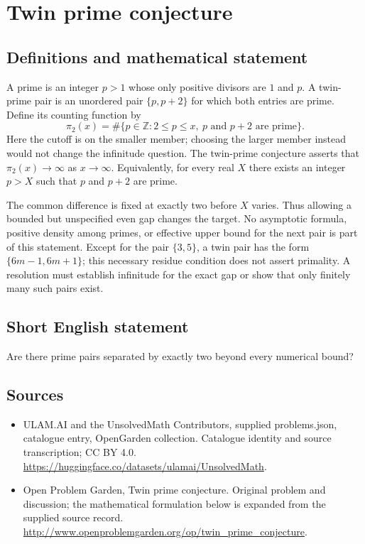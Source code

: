 \documentclass[11pt,a4paper]{article}
\begin{document}
\section*{Twin prime conjecture}\label{statement}

\subsection{Definitions and mathematical statement}
A prime is an integer $p>1$ whose only positive divisors are $1$ and $p$.
A twin-prime pair is an unordered pair $\{p,p+2\}$ for which both
entries are prime. Define its counting function by
\[
 \pi_2(x)=\#\{p\in\mathbb Z:2\le p\le x,
                           \ p\text{ and }p+2\text{ are prime}\}.
\]
Here the cutoff is on the smaller member; choosing the larger member
instead would not change the infinitude question. The twin-prime
conjecture asserts that $\pi_2(x)\to\infty$ as $x\to\infty$.
Equivalently, for every real $X$ there exists an integer $p>X$ such
that $p$ and $p+2$ are prime.

The common difference is fixed at exactly two before $X$ varies. Thus
allowing a bounded but unspecified even gap changes the target.
No asymptotic formula, positive density among primes, or effective
upper bound for the next pair is part of this statement. Except for
the pair $\{3,5\}$, a twin pair has the form $\{6m-1,6m+1\}$; this
necessary residue condition does not assert primality. A resolution
must establish infinitude for the exact gap or show that only finitely
many such pairs exist.
\subsection{Short English statement}
Are there prime pairs separated by exactly two beyond every numerical bound?
\subsection{Sources}
\begin{itemize}
\item[S1] ULAM.AI and the UnsolvedMath Contributors, supplied problems.json, catalogue entry, OpenGarden collection. Catalogue identity and source transcription; CC BY 4.0.
\url{https://huggingface.co/datasets/ulamai/UnsolvedMath}.
\item[S2] Open Problem Garden, Twin prime conjecture. Original problem and discussion; the mathematical formulation below is expanded from the supplied source record.
\url{http://www.openproblemgarden.org/op/twin_prime_conjecture}.
\end{itemize}
\end{document}
